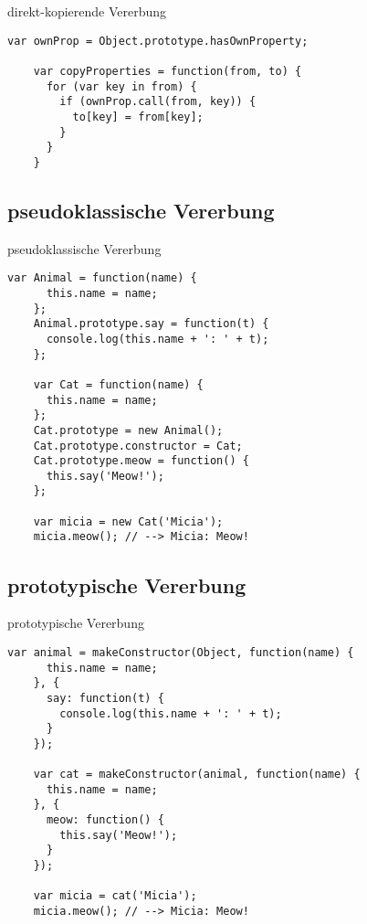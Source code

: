 \begin{frame}[fragile]{direkt-kopierende Vererbung}
  \begin{lstlisting}[gobble=4]
    var ownProp = Object.prototype.hasOwnProperty;
  
    var copyProperties = function(from, to) {
      for (var key in from) {
        if (ownProp.call(from, key)) {
          to[key] = from[key];
        }
      }
    }
  \end{lstlisting}
\end{frame}

\subsection{pseudoklassische Vererbung}

\lstset{basicstyle=\ttfamily\scriptsize}

\begin{frame}[fragile]{pseudoklassische Vererbung}
  \begin{lstlisting}[gobble=4]
    var Animal = function(name) {
      this.name = name;
    };
    Animal.prototype.say = function(t) {
      console.log(this.name + ': ' + t);
    };
    
    var Cat = function(name) {
      this.name = name;
    };
    Cat.prototype = new Animal();
    Cat.prototype.constructor = Cat;
    Cat.prototype.meow = function() {
      this.say('Meow!');
    };
    
    var micia = new Cat('Micia');
    micia.meow(); // --> Micia: Meow!
  \end{lstlisting}
\end{frame}

\subsection{prototypische Vererbung}

\begin{frame}[fragile]{prototypische Vererbung}
  \begin{lstlisting}[gobble=4]
    var animal = makeConstructor(Object, function(name) {
      this.name = name;
    }, {
      say: function(t) {
        console.log(this.name + ': ' + t);
      }
    });
    
    var cat = makeConstructor(animal, function(name) {
      this.name = name;
    }, {
      meow: function() {
        this.say('Meow!');
      }
    });
    
    var micia = cat('Micia');
    micia.meow(); // --> Micia: Meow!
  \end{lstlisting}
\end{frame}

